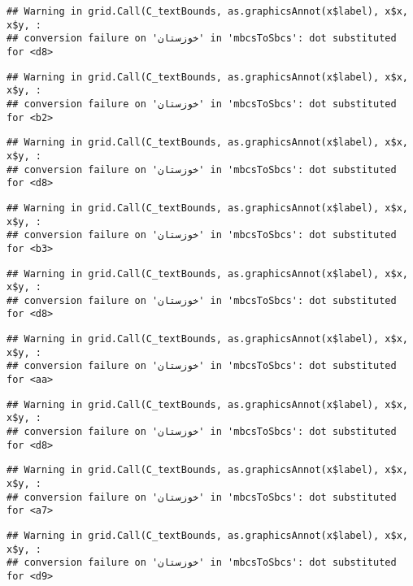 \documentclass[
]{article}
\begin{document}
\begin{verbatim}
## Warning in grid.Call(C_textBounds, as.graphicsAnnot(x$label), x$x, x$y, :
## conversion failure on 'خوزستان' in 'mbcsToSbcs': dot substituted for <d8>
\end{verbatim}

\begin{verbatim}
## Warning in grid.Call(C_textBounds, as.graphicsAnnot(x$label), x$x, x$y, :
## conversion failure on 'خوزستان' in 'mbcsToSbcs': dot substituted for <b2>
\end{verbatim}

\begin{verbatim}
## Warning in grid.Call(C_textBounds, as.graphicsAnnot(x$label), x$x, x$y, :
## conversion failure on 'خوزستان' in 'mbcsToSbcs': dot substituted for <d8>
\end{verbatim}

\begin{verbatim}
## Warning in grid.Call(C_textBounds, as.graphicsAnnot(x$label), x$x, x$y, :
## conversion failure on 'خوزستان' in 'mbcsToSbcs': dot substituted for <b3>
\end{verbatim}

\begin{verbatim}
## Warning in grid.Call(C_textBounds, as.graphicsAnnot(x$label), x$x, x$y, :
## conversion failure on 'خوزستان' in 'mbcsToSbcs': dot substituted for <d8>
\end{verbatim}

\begin{verbatim}
## Warning in grid.Call(C_textBounds, as.graphicsAnnot(x$label), x$x, x$y, :
## conversion failure on 'خوزستان' in 'mbcsToSbcs': dot substituted for <aa>
\end{verbatim}

\begin{verbatim}
## Warning in grid.Call(C_textBounds, as.graphicsAnnot(x$label), x$x, x$y, :
## conversion failure on 'خوزستان' in 'mbcsToSbcs': dot substituted for <d8>
\end{verbatim}

\begin{verbatim}
## Warning in grid.Call(C_textBounds, as.graphicsAnnot(x$label), x$x, x$y, :
## conversion failure on 'خوزستان' in 'mbcsToSbcs': dot substituted for <a7>
\end{verbatim}

\begin{verbatim}
## Warning in grid.Call(C_textBounds, as.graphicsAnnot(x$label), x$x, x$y, :
## conversion failure on 'خوزستان' in 'mbcsToSbcs': dot substituted for <d9>
\end{verbatim}
\end{document}
